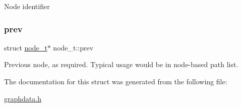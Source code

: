 Node identifier \mbox{\label{structnode__t_aed5643ccd87b35d3fb69f04903e59b95}} 
\subsubsection{\texorpdfstring{prev}{prev}}
{\footnotesize\ttfamily struct \hyperlink{structnode__t}{node\+\_\+t}$\ast$ node\+\_\+t\+::prev}



Previous node, as required. Typical usage would be in node-\/based path list. 



The documentation for this struct was generated from the following file\+:\begin{DoxyCompactItemize}
\item 
\hyperlink{graphdata_8h}{graphdata.\+h}\end{DoxyCompactItemize}

